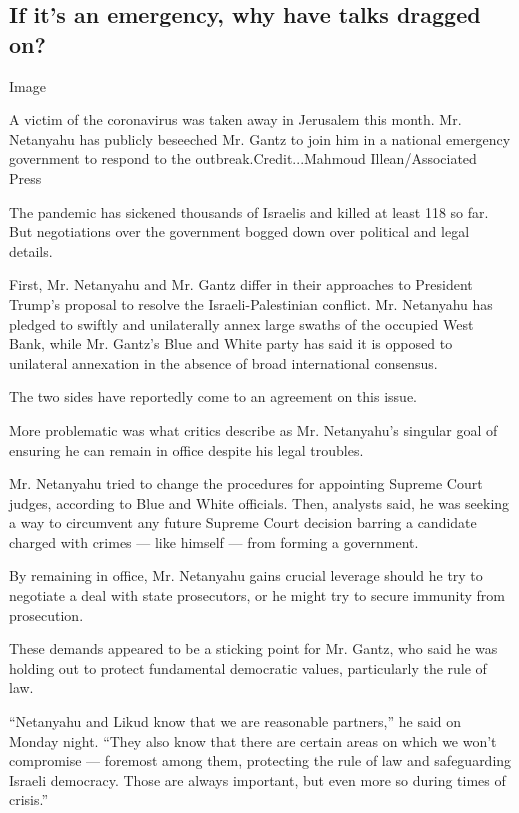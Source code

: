 \hypertarget{if-its-an-emergency-why-have-talks-dragged-on}{%
\subsection{If it's an emergency, why have talks dragged
on?}\label{if-its-an-emergency-why-have-talks-dragged-on}}

Image

A victim of the coronavirus was taken away in Jerusalem this month. Mr.
Netanyahu has publicly beseeched Mr. Gantz to join him in a national
emergency government to respond to the outbreak.Credit...Mahmoud
Illean/Associated Press

The pandemic has sickened thousands of Israelis and killed at least 118
so far. But negotiations over the government bogged down over political
and legal details.

First, Mr. Netanyahu and Mr. Gantz differ in their approaches to
President Trump's proposal to resolve the Israeli-Palestinian conflict.
Mr. Netanyahu has pledged to swiftly and unilaterally annex large swaths
of the occupied West Bank, while Mr. Gantz's Blue and White party has
said it is opposed to unilateral annexation in the absence of broad
international consensus.

The two sides have reportedly come to an agreement on this issue.

More problematic was what critics describe as Mr. Netanyahu's singular
goal of ensuring he can remain in office despite his legal troubles.

Mr. Netanyahu tried to change the procedures for appointing Supreme
Court judges, according to Blue and White officials. Then, analysts
said, he was seeking a way to circumvent any future Supreme Court
decision barring a candidate charged with crimes --- like himself ---
from forming a government.

By remaining in office, Mr. Netanyahu gains crucial leverage should he
try to negotiate a deal with state prosecutors, or he might try to
secure immunity from prosecution.

These demands appeared to be a sticking point for Mr. Gantz, who said he
was holding out to protect fundamental democratic values, particularly
the rule of law.

``Netanyahu and Likud know that we are reasonable partners,'' he said on
Monday night. ``They also know that there are certain areas on which we
won't compromise --- foremost among them, protecting the rule of law and
safeguarding Israeli democracy. Those are always important, but even
more so during times of crisis.''

